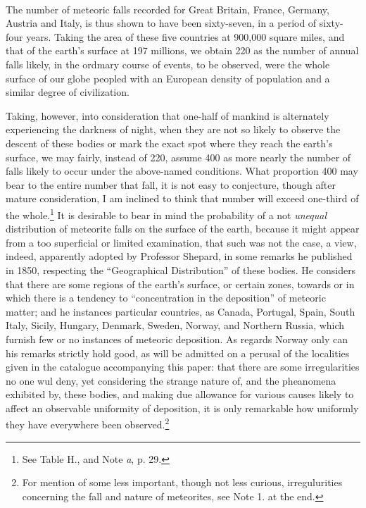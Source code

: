 \documentclass[a4paper, 12pt, oneside]{article}
\begin{document}
\paragraph{}
The number of meteoric falls recorded for Great Britain, France, Germany, Austria and Italy, is thus shown to have been sixty-seven, in a period of sixty-four years. Taking the area of these five countries at 900,000 square miles, and that of the earth's surface at 197 millions, we obtain 220 as the number of annual falls likely, in the ordmary course of events, to be observed, were the whole surface of our globe peopled with an European density of population and a similar degree of civilization.

Taking, however, into consideration that one-half of mankind is alternately experiencing the darkness of night, when they are not so likely to observe the descent of these bodies or mark the exact spot where they reach the earth's surface, we may fairly, instead of 220, assume 400 as more nearly the number of falls likely to occur under the above-named conditions. What proportion 400 may bear to the entire number that fall, it is not easy to conjecture, though after mature consideration, I am inclined to think that number will exceed one-third of the whole.\footnote{See Table H., and Note \emph{a}, p. 29.} It is desirable to bear in mind the probability of a not \emph{unequal} distribution of meteorite falls on the surface of the earth, because it might appear from a too superficial or limited examination, that such was not the case, a view, indeed, apparently adopted by Professor Shepard, in some remarks he published in 1850, respecting the ``Geographical Distribution'' of these bodies. He considers that there are some regions of the earth's surface, or certain zones, towards or in which there is a tendency to ``concentration in the deposition'' of meteoric matter; and he instances particular countries, as Canada, Portugal, Spain, South Italy, Sicily, Hungary, Denmark, Sweden, Norway, and Northern Russia, which furnish few or no instances of meteoric deposition. As regards Norway only can his remarks strictly hold good, as will be admitted on a perusal of the localities given in the catalogue accompanying this paper: that there are some irregularities no one wul deny, yet considering the strange nature of, and the pheanomena exhibited by, these bodies, and making due allowance for various causes likely to affect an observable uniformity of deposition, it is only remarkable how uniformly they have everywhere been observed.\footnote{For mention of some less important, though not less curious, irregulurities concerning the fall and nature of meteorites, see Note 1. at the end.}
\end{document}
